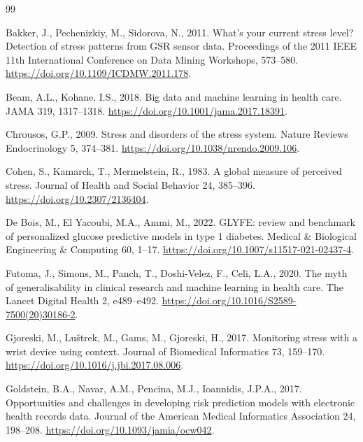 \documentclass[preprint,12pt,authoryear]{elsarticle}
\begin{document}
\newpage

\begin{thebibliography}{99}

Bakker, J., Pechenizkiy, M., Sidorova, N., 2011.
What's your current stress level? Detection of stress patterns from
GSR sensor data.
Proceedings of the 2011 IEEE 11th International Conference on Data
Mining Workshops, 573--580.
\url{https://doi.org/10.1109/ICDMW.2011.178}.

Beam, A.L., Kohane, I.S., 2018.
Big data and machine learning in health care.
JAMA 319, 1317--1318.
\url{https://doi.org/10.1001/jama.2017.18391}.

Chrousos, G.P., 2009.
Stress and disorders of the stress system.
Nature Reviews Endocrinology 5, 374--381.
\url{https://doi.org/10.1038/nrendo.2009.106}.

Cohen, S., Kamarck, T., Mermelstein, R., 1983.
A global measure of perceived stress.
Journal of Health and Social Behavior 24, 385--396.
\url{https://doi.org/10.2307/2136404}.

De Bois, M., El Yacoubi, M.A., Ammi, M., 2022.
GLYFE: review and benchmark of personalized glucose predictive models in
type 1 diabetes.
Medical \& Biological Engineering \& Computing 60, 1--17.
\url{https://doi.org/10.1007/s11517-021-02437-4}.

Futoma, J., Simons, M., Panch, T., Doshi-Velez, F., Celi, L.A., 2020.
The myth of generalisability in clinical research and machine learning
in health care.
The Lancet Digital Health 2, e489--e492.
\url{https://doi.org/10.1016/S2589-7500(20)30186-2}.

Gjoreski, M., Lu\v{s}trek, M., Gams, M., Gjoreski, H., 2017.
Monitoring stress with a wrist device using context.
Journal of Biomedical Informatics 73, 159--170.
\url{https://doi.org/10.1016/j.jbi.2017.08.006}.

Goldstein, B.A., Navar, A.M., Pencina, M.J., Ioannidis, J.P.A., 2017.
Opportunities and challenges in developing risk prediction models with
electronic health records data.
Journal of the American Medical Informatics Association 24, 198--208.
\url{https://doi.org/10.1093/jamia/ocw042}.


\end{thebibliography}
\end{document}
